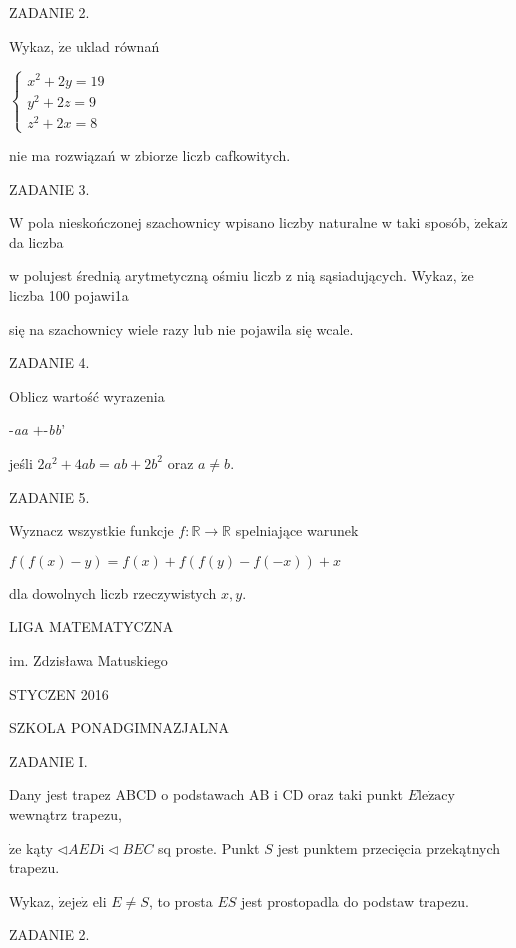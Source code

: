 \documentclass[a4paper,12pt]{article}
\begin{document}
ZADANIE 2.

Wykaz, $\dot{\mathrm{z}}\mathrm{e}$ uklad równań

$\left\{\begin{array}{l}
x^{2}+2y=19\\
y^{2}+2z=9\\
z^{2}+2x=8
\end{array}\right.$

nie ma rozwiązań w zbiorze liczb cafkowitych.

ZADANIE 3.

$\mathrm{W}$ pola nieskończonej szachownicy wpisano liczby naturalne w taki sposób, $\dot{\mathrm{z}}\mathrm{e} \mathrm{k}\mathrm{a}\dot{\mathrm{z}}$ da liczba

w polujest średnią arytmetyczną ośmiu liczb z nią sąsiadujących. Wykaz, $\dot{\mathrm{z}}\mathrm{e}$ liczba 100 pojawi1a

się na szachownicy wiele razy lub nie pojawila się wcale.

ZADANIE 4.

Oblicz wartość wyrazenia

-{\it aa} $+$-{\it bb}'

jeśli $2a^{2}+4ab=ab+2b^{2}$ oraz $a\neq b.$

ZADANIE 5.

Wyznacz wszystkie funkcje $f:\mathbb{R}\rightarrow \mathbb{R}$ spelniające warunek

$f(f(x)-y)=f(x)+f(f(y)-f(-x))+x$

dla dowolnych liczb rzeczywistych $x, y.$






LIGA MATEMATYCZNA

im. Zdzisława Matuskiego

STYCZEN 2016

SZKOLA PONADGIMNAZJALNA

ZADANIE I.

Dany jest trapez ABCD o podstawach AB $\mathrm{i}$ CD oraz taki punkt $E\mathrm{l}\mathrm{e}\dot{\mathrm{z}}\mathrm{a}\mathrm{c}\mathrm{y}$ wewnątrz trapezu,

$\dot{\mathrm{z}}\mathrm{e}$ kąty $\triangleleft AED \mathrm{i} \triangleleft BEC$ sq proste. Punkt $S$ jest punktem przecięcia przekątnych trapezu.

Wykaz, $\dot{\mathrm{z}}\mathrm{e}\mathrm{j}\mathrm{e}\dot{\mathrm{z}}$ eli $E\neq S$, to prosta $ES$ jest prostopadla do podstaw trapezu.

ZADANIE 2.
\end{document}
